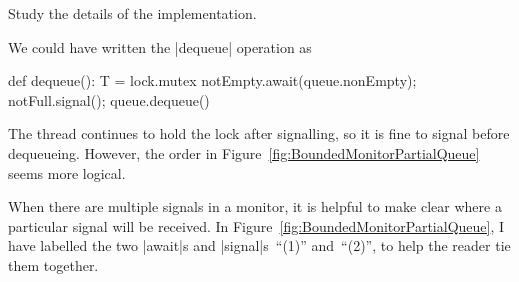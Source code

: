 \begin{instruction}
Study the details of the implementation.
\end{instruction}

We could have written the |dequeue| operation as
%
\begin{scala}
  def dequeue(): T = lock.mutex{
    notEmpty.await(queue.nonEmpty); notFull.signal(); queue.dequeue()
  }
\end{scala}
%
The thread continues to hold the lock after signalling, so it is fine to
signal before dequeueing.  However, the order in
Figure~\ref{fig:BoundedMonitorPartialQueue} seems more logical.

When there are multiple signals in a monitor, it is helpful to make clear
where a particular signal will be received.  In
Figure~\ref{fig:BoundedMonitorPartialQueue}, I have labelled the two |await|s
and |signal|s~``(1)'' and~``(2)'', to help the reader tie them together. 
